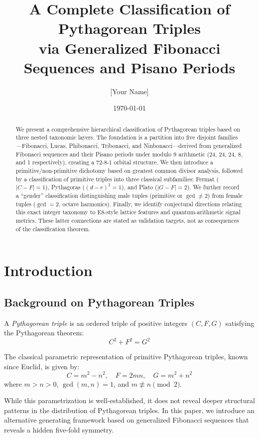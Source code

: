 \documentclass[12pt]{article}
\title{A Complete Classification of Pythagorean Triples\\via Generalized Fibonacci Sequences and Pisano Periods}
\author{[Your Name]\\[Your Affiliation]}
\date{\today}
\begin{document}
\maketitle

\begin{abstract}
We present a comprehensive hierarchical classification of Pythagorean triples based on three nested taxonomic layers. The foundation is a partition into five disjoint families---Fibonacci, Lucas, Phibonacci, Tribonacci, and Ninbonacci---derived from generalized Fibonacci sequences and their Pisano periods under modulo 9 arithmetic (24, 24, 24, 8, and 1 respectively), creating a 72-8-1 orbital structure. We then introduce a primitive/non-primitive dichotomy based on greatest common divisor analysis, followed by a classification of primitive triples into three classical subfamilies: Fermat ($|C-F|=1$), Pythagoras ($(d-e)^2=1$), and Plato ($|G-F|=2$). We further record a ``gender'' classification distinguishing male tuples (primitive or $\gcd \neq 2$) from female tuples ($\gcd=2$, octave harmonics). Finally, we identify conjectural directions relating this exact integer taxonomy to E8-style lattice features and quantum-arithmetic signal metrics. These latter connections are stated as validation targets, not as consequences of the classification theorem.
\end{abstract}

\section{Introduction}

\subsection{Background on Pythagorean Triples}

A \emph{Pythagorean triple} is an ordered triple of positive integers $(C, F, G)$ satisfying the Pythagorean theorem:
\begin{equation}
C^2 + F^2 = G^2
\end{equation}

The classical parametric representation of primitive Pythagorean triples, known since Euclid, is given by:
\begin{equation}
C = m^2 - n^2, \quad F = 2mn, \quad G = m^2 + n^2
\end{equation}
where $m > n > 0$, $\gcd(m,n) = 1$, and $m \not\equiv n \pmod{2}$.

While this parametrization is well-established, it does not reveal deeper structural patterns in the distribution of Pythagorean triples. In this paper, we introduce an alternative generating framework based on generalized Fibonacci sequences that reveals a hidden five-fold symmetry.
\end{document}
